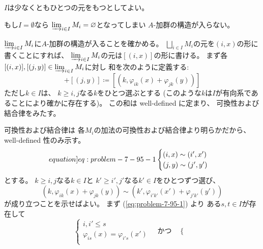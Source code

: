 \documentclass[report]{jlreq}
\begin{document}
\begin{answer}
    $I$は少なくともひとつの元をもつとしてよい。
    \begin{innerproof}
        もし$I = \emptyset$なら
        $\varinjlim_{i \in I} M_i = \emptyset$となってしまい
        $A$-加群の構造が入らない。
    \end{innerproof}
    $\varinjlim_{i \in I} M_i$に$A$-加群の構造が入ることを確かめる。
    $\bigsqcup_{i \in I} M_i$の元を$(i, x)$の形に書くことにすれば、
    $\varinjlim_{i \in I} M_i$の元は$[(i, x)]$の形に書ける。
    まず各$[(i, x)], [(j, y)] \in \varinjlim_{i \in I} M_i$に対し
    和を次のように定義する:
    \begin{equation}
        [(i, x)] + [(j, y)]
            \coloneqq [(k, \varphi_{ik}(x) + \varphi_{jk}(y))]
    \end{equation}
    ただし$k \in I$は、
    $k \ge i, j$なる$k$をひとつ選ぶとする
    (このような$k$は$I$が有向系であることにより確かに存在する)。
    この和は well-defined に定まり、
    可換性および結合律をみたす。
    \begin{innerproof}
        可換性および結合律は
        各$M_i$の加法の可換性および結合律より明らかだから、
        well-defined 性のみ示す。
        \begin{equation}
            \label[equation]{eq:problem-7-95-1}
            \begin{cases}
                (i, x) \sim (i', x') \\
                (j, y) \sim (j', y')
            \end{cases}
        \end{equation}
        とする。
        $k \ge i, j$なる$k \in I$と
        $k' \ge i', j'$なる$k' \in I$をひとつずつ選び、
        \begin{equation}
            (k, \varphi_{ik}(x) + \varphi_{jk}(y))
                \sim (k', \varphi_{i'k'}(x') + \varphi_{j'k'}(y'))
        \end{equation}
        が成り立つことを示せばよい。
        まず (\cref{eq:problem-7-95-1}) より
        ある$s, t \in I$が存在して
        \begin{equation}
            \begin{cases}
                i, i' \le s \\
                \varphi_{is}(x) = \varphi_{i's}(x') \\
            \end{cases}
            \quad \text{かつ} \quad
            \begin{cases}

\end{cases}
\end{equation}
\end{innerproof}
\end{answer}
\end{document}
